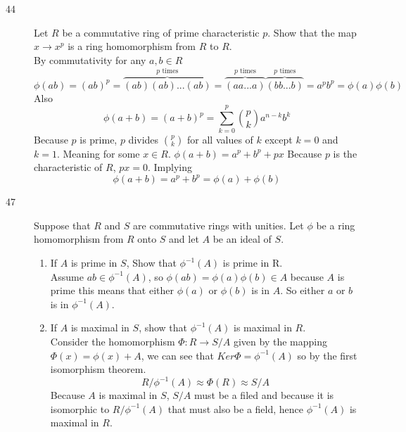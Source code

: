 \documentclass[11pt]{article}
\begin{document}
\begin{description}
\begin{description}
		\end{description}
	\item[44]
		Let $R$ be a commutative ring of prime characteristic $p$. Show
		that the map $x \rightarrow x^p$ is a ring homomorphism from $R$
		to $R$.\\
		By commutativity for any $a,b \in R$
		$$\phi(ab) = (ab)^p
		= \overbrace{(ab)(ab)...(ab)}^{p \text{ times}}  
		= \overbrace{(aa...a)}^{p \text{ times}} \overbrace{(bb...b)}^{p \text{ times}}  
		=a^pb^p
		= \phi(a)\phi(b) $$
		Also
		$$ \phi(a+b) = (a + b)^p = \sum_{k=0}^p\binom{p}{k} a^{n-k}b^k$$
		Because $p$ is prime, $p$ divides $\binom{p}{k}$ for all
		values of $k$ except $k = 0$ and $k = 1$. Meaning for some
		$x \in R$.
		$\phi(a + b) = a^p + b^p + px $
		Because $p$ is the characteristic of $R$, $px = 0$. Implying
		$$\phi(a + b) = a^p + b^p = \phi(a) + \phi(b) $$
	\item[47] Suppose that $R$ and $S$ are commutative rings with unities.
		Let $\phi$ be a ring homomorphism from $R$ onto $S$ and let $A$ be
		an ideal of $S$.
		\begin{enumerate}
		\item If $A$ is prime in $S$, Show that $\phi^{-1}(A)$ is prime in R.\\
			Assume $ab \in \phi^{-1}(A)$, so $\phi(ab) =
				\phi(a)\phi(b) \in A$ because $A$ is prime this
				means that either $\phi(a)$ or $\phi(b)$ is in
				$A$. So either $a$ or $b$ is in $\phi^{-1}(A)$.
		\item  If $A$ is maximal in $S$, show that $\phi^{-1}(A)$ is maximal in $R$.\\
			Consider the homomorphism $\Phi: R \rightarrow S/A$
				given by the mapping $\Phi(x) = \phi(x) + A$, we
				can see that $Ker \Phi = \phi^{-1}(A)$ so by the
				first isomorphism theorem.
				$$ R/\phi^{-1}(A) \approx \Phi(R) \approx S/A$$
				Because $A$ is maximal in $S$, $S/A$ must be a
				filed and because it is isomorphic to
				$R/\phi^{-1}(A)$ that must also be a field,
				hence $\phi^{-1}(A)$ is maximal in $R$.
		\end{enumerate}


\end{description}
\end{document}
